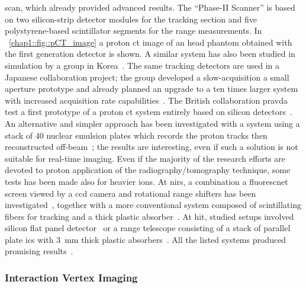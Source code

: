 scan, which already provided advanced results. The \enquote{Phase-II Scanner} is based on two silicon-strip detector modules for the tracking section and five polystyrene-based scintillator segments for the range measurements. In \figurename~\ref{chap1::fig::pCT_image} a proton \gls{ct} image of an head phantom obtained with the first generation detector is shown. A similar system has also been studied in simulation by a group in Korea~\parencite{Lee2016}. The same tracking detectors are used in a Japanese collaboration project; the group developed a slow-acquisition a small aperture prototype and already planned an upgrade to a ten times larger system with increased acquisition rate capabilities~\parencite{Saraya2014}. The British collaboration \gls{pravda} test a first prototype of a proton \gls{ct} system entirely based on silicon detectors~\parencite{Taylor2014, Taylor2016}. An alternative and simpler approach has been investigated with a system using a stack of 40 nuclear emulsion plates which records the proton tracks then reconstructed off-beam~\parencite{Braccini2010b}; the results are interesting, even if such a solution is not suitable for real-time imaging.   
Even if the majority of the research efforts are devoted to proton application of the radiography/tomography technique, some tests has been made also for heavier ions. At \gls{nirs}, a combination a fluorescnet screen viewed by a \gls{ccd} camera and rotational range shifters has been investigated~\parencite{Abe2002}, together with a more conventional system composed of scintillating fibers for tracking and a thick plastic absorber~\parencite{Shinoda2006}. At \gls{hit}, studied setups involved silicon flat panel detector~\parencite{Telsemeyer2012} or a range telescope consisting of a stack of parallel plate \glspl{ic} with 3~mm thick plastic absorbers~\parencite{Rinaldi2013}. All the listed systems produced promising results~\parencite{Parodi2014}.

\subsubsection{Interaction Vertex Imaging}\label{chap1::subsec::IVI}

